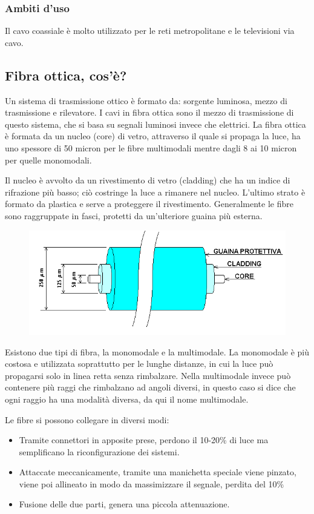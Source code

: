 \subsubsection{Ambiti d'uso}
Il cavo coassiale è molto utilizzato per le reti metropolitane e le televisioni via cavo.

\subsection{Fibra ottica, cos'è?}
Un sistema di trasmissione ottico è formato da: sorgente luminosa, mezzo di trasmissione e rilevatore. I cavi in fibra ottica sono il mezzo di trasmissione di questo sistema, che si basa su segnali luminosi invece che elettrici.
La fibra ottica è formata da un nucleo (core) di vetro, attraverso il quale si propaga la luce, ha uno spessore di 50 micron per le fibre multimodali mentre dagli 8 ai 10 micron per quelle monomodali.

Il nucleo è avvolto da un rivestimento di vetro (cladding) che ha un indice di rifrazione più basso; ciò costringe la luce a rimanere nel nucleo. L’ultimo strato è formato da plastica e serve a proteggere il rivestimento. Generalmente le fibre sono raggruppate in fasci, protetti da un’ulteriore guaina più esterna.  

\begin{figure}[H]
\centering
\includegraphics[scale=0.7]{res/img/3_FibraOttica.png}
\end{figure}

Esistono due tipi di fibra, la monomodale e la multimodale. La monomodale è più costosa e utilizzata soprattutto per le lunghe distanze, in cui la luce può propagarsi solo in linea retta senza rimbalzare.
Nella multimodale invece può contenere più raggi che rimbalzano ad angoli diversi, in questo caso si dice che ogni raggio ha una modalità diversa, da qui il nome multimodale.

Le fibre si possono collegare in diversi modi:
\begin{itemize}
\item Tramite connettori in apposite prese, perdono il 10-20\% di luce ma semplificano la riconfigurazione dei sistemi. 
\item Attaccate meccanicamente, tramite una manichetta speciale viene pinzato, viene poi allineato in modo da massimizzare il segnale, perdita del 10\% 
\item Fusione delle due parti, genera una piccola attenuazione.
\end{itemize}

